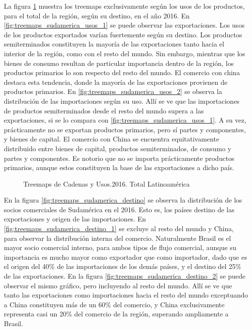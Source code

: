 \documentclass[class=article, crop=false]{standalone}
\begin{document}
La figura \ref{fig:treemaps_sudamerica_usos} muestra los treemaps exclusivamente según los usos de los productos, para el total de la región, según su destino, en el año 2016. En \ref{fig:treemaps_sudamerica_usos_1} se puede observar las exportaciones. Los usos de los productos exportados varían fuertemente según su destino. Los productos semiterminados constituyen la mayoría de las exportaciones tanto hacia el interior de la región, como con el resto del mundo. Sin embargo, mientras que los bienes de consumo resultan de particular importancia dentro de la región, los productos primarios lo son respecto del resto del mundo. El comercio con china destaca esta tendencia, donde la mayoría de las exportaciones provienen de productos primarios. En \ref{fig:treemaps_sudamerica_usos_2} se observa la distribución de las importaciones según su uso. Allí se ve que las importaciones de productos semiterminados desde el resto del mundo supera a las exportaciones, si se lo compara con \ref{fig:treemaps_sudamerica_usos_1}. A su vez, prácticamente no se exportan productos primarios, pero sí partes y componentes, y bienes de capital. El comercio con China se encuentra equitativamente distribuido entre bienes de capital, productos semiterminados, de consumo y partes y componentes. Es notorio que no se importa prácticamente productos primarios, aunque estos constituyen la base de las exportaciones a dicho país. 

\begin{figure}
	\centering
	\caption{Treemaps de Cadenas y Usos.2016. Total Latinoamérica}
	\label{fig:treemaps_sudamerica_usos}
\end{figure}




En la figura \ref{fig:treemaps_sudamerica_destino} se observa la distribución de los socios comerciales de Sudamérica en el 2016. Esto es, los países destino de las exportaciones y origen de las importaciones. En \ref{fig:treemaps_sudamerica_destino_1} se excluye al resto del mundo y China, para observar la distribución interna del comercio. Naturalmente Brasil es el mayor socio comercial interno, para ambos tipos de flujo comercial, aunque su importancia es mucho mayor como exportador que como importador, dado que es el origen del 40\% de las importaciones de los demás países, y el destino del 25\% de las exportaciones. 
En la figura \ref{fig:treemaps_sudamerica_destino_2} se puede observar el mismo gráfico, pero incluyendo al resto del mundo. Allí se ve que tanto las exportaciones como importaciones hacia el resto del mundo exceptuando a China constituyen más de un 60\% del comercio, y China exclusivamente representa casi un 20\% del comercio de la región, superando ampliamente a Brasil. 
\end{document}

